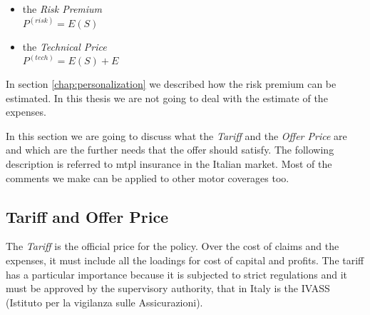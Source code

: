 \documentclass[a4paper, twoside, openright, 12pt]{report}
\providecommand{\tightlist}{%
  \setlength{\itemsep}{0pt}\setlength{\parskip}{0pt}}
\theoremstyle{definition}
\theoremstyle{definition}
\theoremstyle{definition}
\theoremstyle{remark}
\begin{document}
\begin{itemize}
\tightlist
\item
  the \emph{Risk Premium}\\
  \(P^{(risk)} = E(S)\)
\item
  the \emph{Technical Price}\\
  \(P^{(tech)} = E(S) + E\)
\end{itemize}

In section \ref{chap:personalization} we described how the risk premium can be estimated. In this thesis we are not going to deal with the estimate of the expenses.

In this section we are going to discuss what the \emph{Tariff} and the \emph{Offer Price} are and which are the further needs that the offer should satisfy. The following description is referred to \ac{mtpl} insurance in the Italian market. Most of the comments we make can be applied to other motor coverages too.

\hypertarget{tariff-and-offer-price}{%
\subsection{Tariff and Offer Price}\label{tariff-and-offer-price}}

The \emph{Tariff} is the official price for the policy. Over the cost of claims and the expenses, it must include all the loadings for cost of capital and profits. The tariff has a particular importance because it is subjected to strict regulations and it must be approved by the supervisory authority, that in Italy is the IVASS (Istituto per la vigilanza sulle Assicurazioni).
\end{document}
